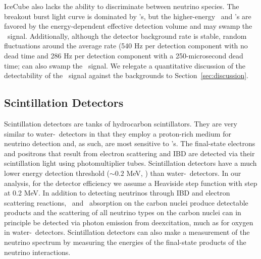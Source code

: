 IceCube also lacks the ability to discriminate between neutrino species.  The 
    breakout burst light curve is dominated by \nue's, but the higher-energy 
    \anue\ and \nux's are favored by the energy-dependent effective detection 
    volume and may swamp the \nue\ signal.  Additionally, although the detector 
    background rate is stable, random fluctuations around the average rate (540 Hz 
    per detection component with no dead time and 286 Hz per detection component 
    with a 250-microsecond dead time; \citealt{abbasietal2011} can also swamp the 
    \nue\ signal.  We relegate a quantitative discussion of the detectability of 
    the \nue\ signal against the backgrounds to Section~\ref{sec:discussion}.


\subsection{Scintillation Detectors}
Scintillation detectors are tanks of hydrocarbon 
scintillators.  They are very similar to water-\cer\
detectors in that 
they employ a proton-rich medium for neutrino detection 
and, as such, are most sensitive  to
\anue's. The final-state electrons and positrons that result from
electron scattering and IBD are detected via their scintillation light
using photomultiplier tubes. 
 Scintillation detectors have a much lower energy detection threshold  
(${\sim}0.2$ MeV, \citealt{lahaetal2014}) than
 water-\cer\ detectors.  In our analysis, 
for the detector efficiency we assume a Heaviside step function 
with step at 0.2 MeV. In addition to detecting
neutrinos through IBD and electron scattering reactions, \nue\
and \anue\ absorption on the carbon nuclei produce detectable
products and the scattering
of all neutrino types on the carbon nuclei can 
in principle  be detected via photon
emission from deexcitation, much as for oxygen in water-\cer\
detectors.  Scintillation detectors can also make a measurement of the
neutrino spectrum by measuring the energies of the final-state
products of the neutrino interactions.


